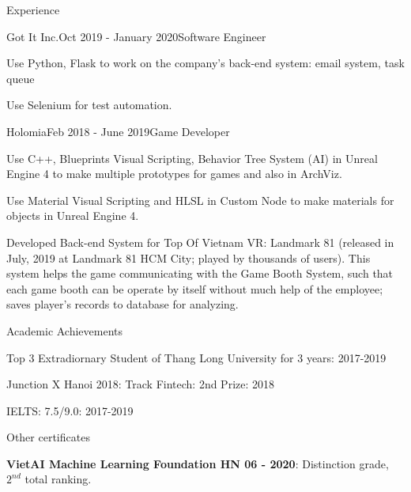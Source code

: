 \documentclass{resume} %
\begin{document}
\begin{rSection}{Experience}

\begin{rSubsection}{Got It Inc.}{Oct 2019 - January 2020}{Software Engineer}{}
  \item Use Python, Flask to work on the company's back-end system: email system, task queue
  \item Use Selenium for test automation.
  \end{rSubsection}
    
\begin{rSubsection}{Holomia}{Feb 2018 - June 2019}{Game Developer}{}
\item Use C++, Blueprints Visual Scripting, Behavior Tree System (AI) in Unreal Engine 4 to make multiple prototypes for games and also in ArchViz.
\item Use Material Visual Scripting and HLSL in Custom Node to make materials for objects in Unreal Engine 4.
\item Developed Back-end System for Top Of Vietnam VR: Landmark 81 (released in July, 2019 at Landmark 81 HCM City; played by thousands of users). This system helps the game communicating with the Game Booth System, such that each game booth can be operate by itself without much help of the employee; saves player's records to database for analyzing.
\end{rSubsection}

\end{rSection}



\begin{rSection}{Academic Achievements} \itemsep -2pt
\item Top 3 Extradiornary Student of Thang Long University for 3 years: 2017-2019 
\item Junction X Hanoi 2018: Track Fintech: 2nd Prize: 2018
\item IELTS: 7.5/9.0: 2017-2019
\end{rSection}

\begin{rSection}{Other certificates}

\item  \textbf{VietAI Machine Learning Foundation HN 06 - 2020}: Distinction grade, $2^{nd}$ total ranking.

\end{rSection}
\end{document}
